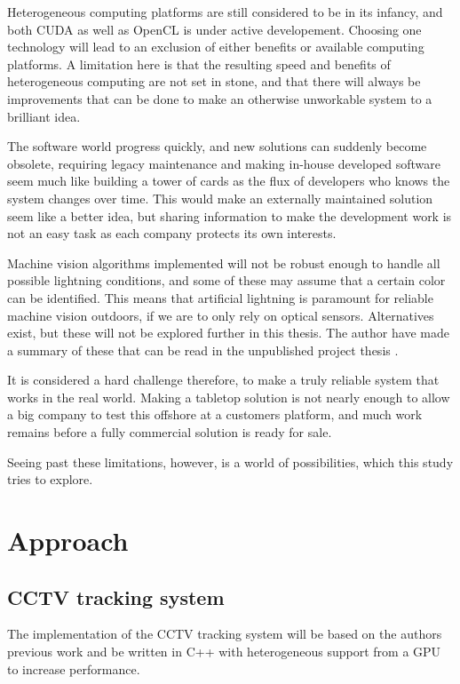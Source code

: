 Heterogeneous computing platforms are still considered to be in its infancy, and both CUDA as well as OpenCL is under active developement. Choosing one technology will lead to an exclusion of either benefits or available computing platforms. A limitation here is that the resulting speed and benefits of heterogeneous computing are not set in stone, and that there will always be improvements that can be done to make an otherwise unworkable system to a brilliant idea.

The software world progress quickly, and new solutions can suddenly become obsolete, requiring legacy maintenance and making in-house developed software seem much like building a tower of cards as the flux of developers who knows the system changes over time. This would make an externally maintained solution seem like a better idea, but sharing information to make the development work is not an easy task as each company protects its own interests.

Machine vision algorithms implemented will not be robust enough to handle all possible lightning conditions, and some of these may assume that a certain color can be identified. This means that artificial lightning is paramount for reliable machine vision outdoors, if we are to only rely on optical sensors. Alternatives exist, but these will not be explored further in this thesis. The author have made a summary of these that can be read in the unpublished project thesis \citet{joakimsk14}.

It is considered a hard challenge therefore, to make a truly reliable system that works in the real world. Making a tabletop solution is not nearly enough to allow a big company to test this offshore at a customers platform, and much work remains before a fully commercial solution is ready for sale.

Seeing past these limitations, however, is a world of possibilities, which this study tries to explore.

\section{Approach}
\subsection{CCTV tracking system}
The implementation of the CCTV tracking system will be based on the authors previous work and be written in C++ with heterogeneous support from a GPU to increase performance.

